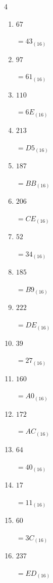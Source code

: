 \begin{multicols}{4}
\begin{enumerate}
  \item $67$

        $=43_{(16)}$

  \item $97$

        $=61_{(16)}$

  \item $110$

        $=6E_{(16)}$

  \item $213$

        $=D5_{(16)}$

  \item $187$

        $=BB_{(16)}$

  \item $206$

        $=CE_{(16)}$

  \item $52$

        $=34_{(16)}$

  \item $185$

        $=B9_{(16)}$

  \item $222$

        $=DE_{(16)}$

\columnbreak %

\resetques

  \item $39$

        $=27_{(16)}$

  \item $160$

        $=A0_{(16)}$

  \item $172$

        $=AC_{(16)}$

  \item $64$

        $=40_{(16)}$

  \item $17$

        $=11_{(16)}$

  \item $60$

        $=3C_{(16)}$

  \item $237$

        $=ED_{(16)}$


\end{enumerate}
\end{multicols}
